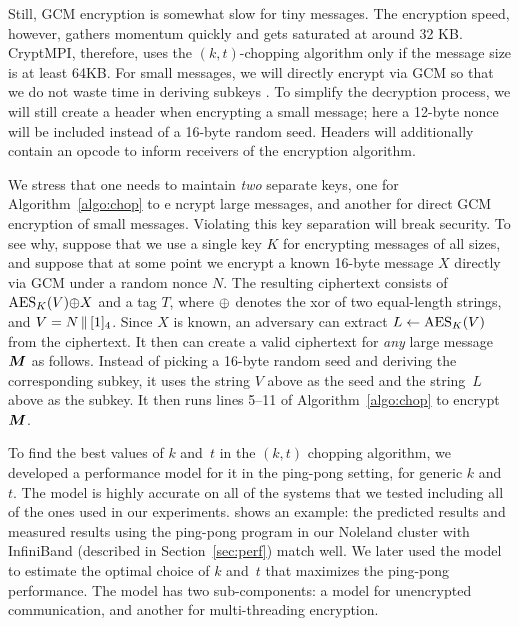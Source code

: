 Still, GCM encryption is somewhat slow for tiny messages.
The encryption speed, however, gathers momentum quickly and gets saturated at around 32 KB.
CryptMPI, therefore,
uses the $(k, t)$-chopping algorithm only if the message size is at least 64KB.
For small messages, we will directly encrypt via GCM so that we do not waste time in deriving subkeys
.
To simplify the decryption process, we will still create a header when encrypting a small message;
here a 12-byte nonce will be included instead of a 16-byte random seed.
Headers will additionally contain an opcode to inform receivers of the encryption algorithm.

We stress that one needs to maintain \emph{two} separate keys, one for Algorithm~\ref{algo:chop} to e
ncrypt large messages,
and another for direct GCM encryption of small messages.
Violating this key separation will break security.
To see why, suppose that we use a single key $K$ for encrypting messages of all sizes,
and suppose that at some point we encrypt a known 16-byte message $X$ directly via GCM under a random
 nonce $N$.
 The resulting ciphertext consists of $\mathrm{AES}_K(V) {\oplus} X$ and a tag $T$,
 where ${\oplus}$ denotes the xor of two equal-length strings, and $V = N {\,\|\,} [1]_{4}$.
 Since $X$ is known, an adversary can extract $L \gets \mathrm{AES}_K(V)$ from the ciphertext.
 It then can create a valid ciphertext for \emph{any} large message $\bm{M}$ as follows.
 Instead of picking a 16-byte random seed and deriving the corresponding subkey,
 it uses the string $V$ above as the seed and the string~$L$ above as the subkey.
 It then runs lines 5--11 of Algorithm~\ref{algo:chop} to encrypt $\bm{M}$.

To find the best values of $k$ and~$t$ in the $(k, t)$ chopping algorithm, 
we developed a performance model for it in the ping-pong setting, 
for generic $k$ and~$t$. The model is highly accurate on all of the systems
that we tested including all of the ones used in our experiments.
 shows an example: the predicted results and measured
results using the ping-pong program in our Noleland cluster with InfiniBand
(described in Section~\ref{sec:perf}) match well.   
We later used the model to estimate the optimal choice of $k$ and~$t$ that maximizes the 
ping-pong performance. 
The model has two sub-components: a model for
unencrypted communication, and another for multi-threading encryption.


